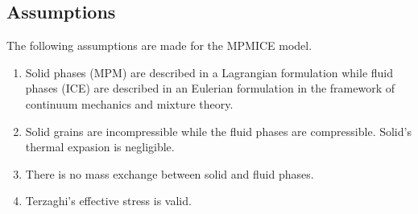 \documentclass[preprint,12pt]{elsarticle}
\begin{document}
\subsection{\textsf{Assumptions}}
The following assumptions are made for the MPMICE model.
\begin{enumerate}
\item Solid phases (MPM) are described in a Lagrangian formulation while fluid phases (ICE) are described in an Eulerian formulation in the framework of continuum mechanics and mixture theory.
\item Solid grains are incompressible while the fluid phases are compressible. Solid's thermal expasion is negligible.
\item There is no mass exchange between solid and fluid phases.
\item Terzaghi's effective stress is valid. 
\end {enumerate}
%
%
\end{document}
